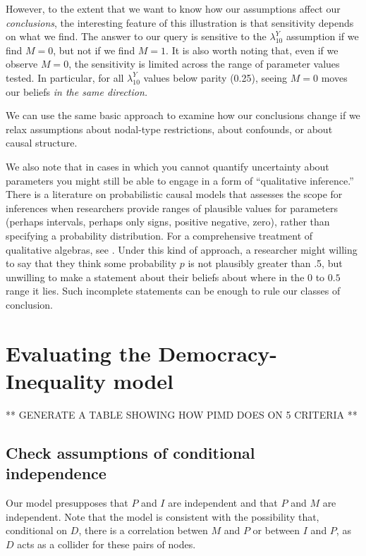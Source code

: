 \documentclass[
  12pt,
]{book}
\begin{document}
However, to the extent that we want to know how our assumptions affect our \emph{conclusions}, the interesting feature of this illustration is that sensitivity depends on what we find. The answer to our query is sensitive to the \(\lambda^Y_{10}\) assumption if we find \(M=0\), but not if we find \(M=1\). It is also worth noting that, even if we observe \(M=0\), the sensitivity is limited across the range of parameter values tested. In particular, for all \(\lambda^Y_{10}\) values below parity (0.25), seeing \(M=0\) moves our beliefs \emph{in the same direction.}

We can use the same basic approach to examine how our conclusions change if we relax assumptions about nodal-type restrictions, about confounds, or about causal structure.

We also note that in cases in which you cannot quantify uncertainty about parameters you might still be able to engage in a form of ``qualitative inference.'' There is a literature on probabilistic causal models that assesses the scope for inferences when researchers provide ranges of plausible values for parameters (perhaps intervals, perhaps only signs, positive negative, zero), rather than specifying a probability distribution. For a comprehensive treatment of qualitative algebras, see \citet{parsons2001qualitative}. Under this kind of approach, a researcher might willing to say that they think some probability \(p\) is not plausibly greater than .5, but unwilling to make a statement about their beliefs about where in the \(0\) to \(0.5\) range it lies. Such incomplete statements can be enough to rule our classes of conclusion.

\hypertarget{evaluating-the-democracy-inequality-model}{%
\section{Evaluating the Democracy-Inequality model}\label{evaluating-the-democracy-inequality-model}}

** GENERATE A TABLE SHOWING HOW PIMD DOES ON 5 CRITERIA **

\hypertarget{check-assumptions-of-conditional-independence}{%
\subsection{Check assumptions of conditional independence}\label{check-assumptions-of-conditional-independence}}

Our model presupposes that \(P\) and \(I\) are independent and that \(P\) and \(M\) are independent. Note that the model is consistent with the possibility that, conditional on \(D\), there is a correlation betwen \(M\) and \(P\) or between \(I\) and \(P\), as \(D\) acts as a collider for these pairs of nodes.
\end{document}
